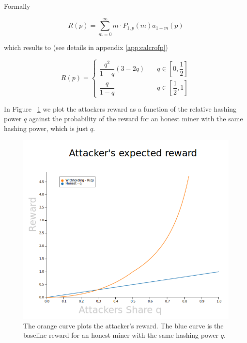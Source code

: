 \documentclass[letterpaper,12pt]{report}
\theoremstyle{plain}
\theoremstyle{definition}
\begin{document}
Formally

\begin{equation}\label{eq:rofpdef}
\mathit{R}(p)=\sum_{m=0}^{\infty}m\cdot\mathit{P}_{1,p}(m)\mathit{a}_{1-m}(p)
\end{equation}

which results to (see details in appendix \ref{app:calcrofp})

\begin{equation}\label{eq:rofp}
\mathit{R}(p)=
\begin{cases}
\dfrac{q^2}{1-q}\left(
3-2q
\right) & \quad q \in [0,\dfrac{1}{2}] \\
\dfrac{q}{1-q} & \quad q \in [\dfrac{1}{2},1] 
\end{cases}
\end{equation}


In Figure ~\ref{fig:AttackersReward} we plot the attackers reward as a function of the relative hashing power $q$ against the probability of the reward for an honest miner with the same hashing power, which is just $q$.

\begin{figure}[reward]
\centering
\includegraphics[width=150mm]{AttackersReward.png}
\caption{The orange curve plots the attacker's reward. The blue curve is the baseline reward for an honest miner with the same hashing power $q$.}
\label{fig:AttackersReward}
\end{figure}
\end{document}

